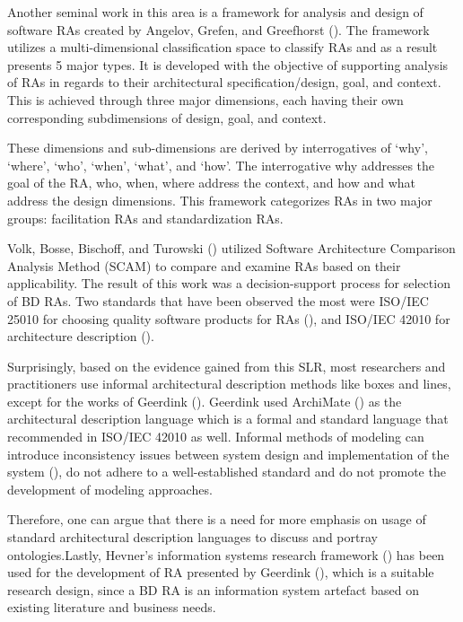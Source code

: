 \documentclass{ieeeaccess}
\begin{document}
Another seminal work in this area is a framework for analysis and design of software RAs created by Angelov, Grefen, and Greefhorst (\cite{angelov2012framework}). The framework utilizes a multi-dimensional classification space to classify RAs and as a result presents 5 major types. It is developed with the objective of supporting analysis of RAs in regards to their architectural specification/design, goal, and context. This is achieved through three major dimensions, each having their own corresponding subdimensions of design, goal, and context. 

These dimensions and sub-dimensions are derived by interrogatives of ‘why’, ‘where’, ‘who’, ‘when’, ‘what’, and ‘how’. The interrogative why addresses the goal of the RA, who, when, where address the context, and how and what address the design dimensions. This framework categorizes RAs in two major groups: facilitation RAs and standardization RAs.

Volk, Bosse, Bischoff, and Turowski (\cite{volk2019decision}) utilized Software Architecture Comparison Analysis Method (SCAM) to compare and examine RAs based on their applicability. The result of this work was a decision-support process for selection of BD RAs. Two standards that have been observed the most were ISO/IEC 25010 for choosing quality software products for RAs (\cite{Iso}), and ISO/IEC 42010 for architecture description (\cite{ISO42010}). 

Surprisingly, based on the evidence gained from this SLR, most researchers and practitioners use informal architectural description methods like boxes and lines, except for the works of Geerdink (\cite{geerdink2013reference}). Geerdink used ArchiMate (\cite{josey2016introduction}) as the architectural description language which is a formal and standard  language that recommended in ISO/IEC 42010 as well. Informal methods of modeling can introduce inconsistency issues between system design and implementation of the system (\cite{zhu2005software}), do not adhere to a well-established standard and do not promote the development of modeling approaches. 

Therefore, one can argue that there is a need for more emphasis on usage of standard architectural description languages to discuss and portray ontologies.Lastly, Hevner's information systems research framework (\cite{hevner2004design}) has been used for the development of RA presented by Geerdink (\cite{geerdink2013reference}), which is a suitable research design, since a BD RA is an information system artefact based on existing literature and business needs. 
\end{document}
